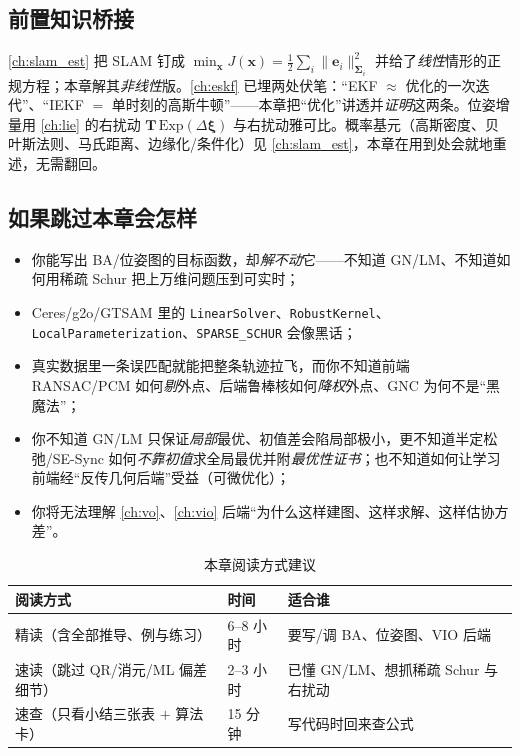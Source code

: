 \subsection*{前置知识桥接}
\cref{ch:slam_est} 把 SLAM 钉成 $\min_{\mathbf{x}}J(\mathbf{x})=\tfrac12\sum_i\|\mathbf{e}_i\|_{\boldsymbol{\Sigma}_i}^2$ 并给了\emph{线性}情形的正规方程；本章解其\emph{非线性}版。\cref{ch:eskf} 已埋两处伏笔：“EKF $\approx$ 优化的一次迭代”、“IEKF $=$ 单时刻的高斯牛顿”——本章把“优化”讲透并\emph{证明}这两条。位姿增量用 \cref{ch:lie} 的右扰动 $\mathbf{T}\,\mathrm{Exp}(\Delta\boldsymbol{\xi})$ 与右扰动雅可比。概率基元（高斯密度、贝叶斯法则、马氏距离、边缘化/条件化）见 \cref{ch:slam_est}，本章在用到处会就地重述，无需翻回。

\subsection*{如果跳过本章会怎样}
\begin{itemize}
  \item 你能写出 BA/位姿图的目标函数，却\emph{解不动}它——不知道 GN/LM、不知道如何用稀疏 Schur 把上万维问题压到可实时；
  \item Ceres/g2o/GTSAM 里的 \texttt{LinearSolver}、\texttt{RobustKernel}、\texttt{LocalParameterization}、\texttt{SPARSE\_SCHUR} 会像黑话；
  \item 真实数据里一条误匹配就能把整条轨迹拉飞，而你不知道前端 RANSAC/PCM 如何\emph{剔}外点、后端鲁棒核如何\emph{降权}外点、GNC 为何不是“黑魔法”；
  \item 你不知道 GN/LM 只保证\emph{局部}最优、初值差会陷局部极小，更不知道半定松弛/SE-Sync 如何\emph{不靠初值}求全局最优并附\emph{最优性证书}；也不知道如何让学习前端经“反传几何后端”受益（可微优化）；
  \item 你将无法理解 \cref{ch:vo}、\cref{ch:vio} 后端“为什么这样建图、这样求解、这样估协方差”。
\end{itemize}

\begin{table}[H]\centering\small
\caption{本章阅读方式建议}
\begin{tabular}{lll}
\toprule
阅读方式 & 时间 & 适合谁 \\
\midrule
精读（含全部推导、例与练习） & 6--8 小时 & 要写/调 BA、位姿图、VIO 后端 \\
速读（跳过 QR/消元/ML 偏差细节） & 2--3 小时 & 已懂 GN/LM、想抓稀疏 Schur 与右扰动 \\
速查（只看小结三张表 $+$ 算法卡） & 15 分钟 & 写代码时回来查公式 \\
\bottomrule
\end{tabular}
\end{table}

